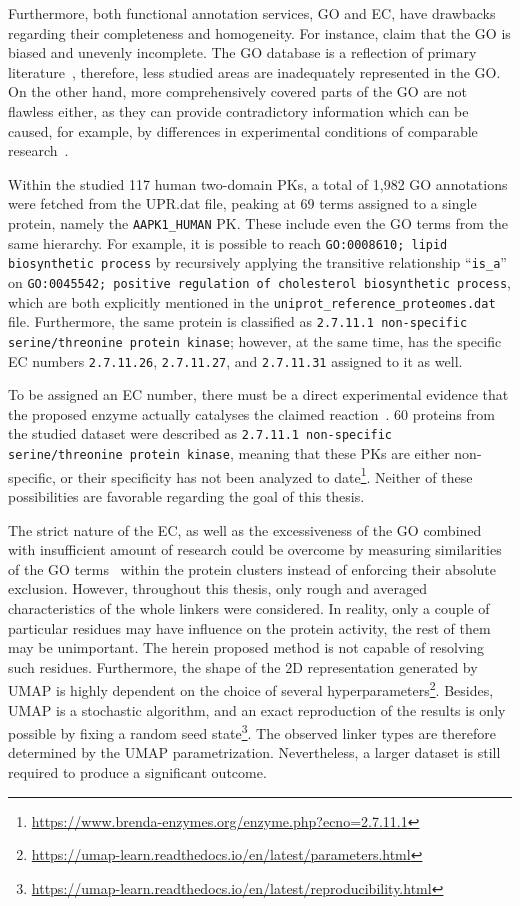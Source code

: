 Furthermore, both functional annotation services, GO and EC, have drawbacks regarding
their completeness and homogeneity.
For instance, \citet{gaudet2017gene} claim that the GO is biased and unevenly incomplete.
The GO database is a reflection of primary literature~\cite{gene2004gene}, therefore, less
studied areas are inadequately represented in the GO.
On the other hand, more comprehensively covered parts of the GO are not flawless either,
as they can provide contradictory information which can be caused, for example, by
differences in experimental conditions of comparable
research~\cite{hass2004response, mason2005multiple}.

Within the studied 117 human two-domain PKs, a total of 1,982 GO annotations were fetched
from the UPR.dat file, peaking at 69 terms assigned to a single protein, namely the
\texttt{AAPK1\_HUMAN} PK.
These include even the GO terms from the same hierarchy.
For example, it is possible to reach \texttt{GO:0008610; lipid biosynthetic process} by
recursively applying the transitive relationship ``\texttt{is\_a}'' on
\texttt{GO:0045542; positive regulation of cholesterol biosynthetic process}, which are
both explicitly mentioned in the \texttt{uniprot\_reference\_proteomes.dat} file.
Furthermore, the same protein is classified as \texttt{2.7.11.1 non-specific
serine/threonine protein kinase}; however, at the same time, has the specific EC numbers
\texttt{2.7.11.26}, \texttt{2.7.11.27}, and \texttt{2.7.11.31} assigned to it as well.

To be assigned an EC number, there must be a direct experimental evidence that the
proposed enzyme actually catalyses the claimed reaction~\cite{mcdonald2014fifty}.
60 proteins from the studied dataset were described as \texttt{2.7.11.1 non-specific
serine/threonine protein kinase}, meaning that these PKs are either non-specific,
or their specificity has not been analyzed to
date\footnote{\url{https://www.brenda-enzymes.org/enzyme.php?ecno=2.7.11.1}}.
Neither of these possibilities are favorable regarding the goal of this thesis.

The strict nature of the EC, as well as the excessiveness of the GO combined with
insufficient amount of research could be overcome by measuring similarities of the GO
terms~\cite{li2010effectively, zhao2018gogo} within the protein clusters instead of
enforcing their absolute exclusion.
However, throughout this thesis, only rough and averaged characteristics of the whole
linkers were considered.
In reality, only a couple of particular residues may have influence on the protein
activity, the rest of them may be unimportant.
The herein proposed method is not capable of resolving such residues.
Furthermore, the shape of the 2D representation generated by UMAP is highly dependent on
the choice of several
hyperparameters\footnote{\url{https://umap-learn.readthedocs.io/en/latest/parameters.html}}.
Besides, UMAP is a stochastic algorithm, and an exact reproduction of the results is only
possible by fixing a random seed
state\footnote{\url{https://umap-learn.readthedocs.io/en/latest/reproducibility.html}}.
The observed linker types are therefore determined by the UMAP parametrization.
Nevertheless, a larger dataset is still required to produce a significant outcome.
